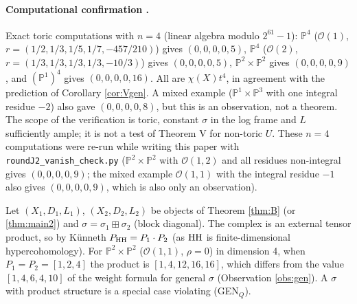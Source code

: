 \paragraph{Computational confirmation \tV.} Exact toric computations with $n=4$ (linear algebra modulo $2^{61}-1$): $\mathbb P^4$ ($\mathcal O(1)$, $r=(1/2,1/3,1/5,1/7,-457/210)$) gives $(0,0,0,0,5)$, $\mathbb P^4$ ($\mathcal O(2)$, $r=(1/3,1/3,1/3,1/3,-10/3)$) gives $(0,0,0,0,5)$, $\mathbb P^2\times\mathbb P^2$ gives $(0,0,0,0,9)$, and $(\mathbb P^1)^4$ gives $(0,0,0,0,16)$. All are $\chi(X)t^4$, in agreement with the prediction of Corollary \ref{cor:Vgen}. A mixed example ($\mathbb P^1\times\mathbb P^3$ with one integral residue $-2$) also gave $(0,0,0,0,8)$, but this is an observation, not a theorem. The scope of the verification is toric, constant $\sigma$ in the log frame and $L$ sufficiently ample; it is not a test of Theorem V for non-toric $U$. These $n=4$ computations were re-run while writing this paper with \texttt{roundJ2\_vanish\_check.py} ($\mathbb P^2\times\mathbb P^2$ with $\mathcal O(1,2)$ and all residues non-integral gives $(0,0,0,0,9)$; the mixed example $\mathcal O(1,1)$ with the integral residue $-1$ also gives $(0,0,0,0,9)$, which is also only an observation).

\begin{ex}[Products \tP \tV]\label{ex:prod}
Let $(X_1,D_1,L_1)$, $(X_2,D_2,L_2)$ be objects of Theorem \ref{thm:B} (or \ref{thm:main2}) and $\sigma=\sigma_1\boxplus\sigma_2$ (block diagonal). The complex is an external tensor product, so by K\"unneth $P_{\mathrm{HH}}=P_1\cdot P_2$ (as $\mathrm{HH}$ is finite-dimensional hypercohomology). For $\mathbb P^2\times\mathbb P^2$ ($\mathcal O(1,1)$, $\rho=0$) in dimension 4, when $P_1=P_2=[1,2,4]$ the product is $[1,4,12,16,16]$, which differs from the value $[1,4,6,4,10]$ of the weight formula for general $\sigma$ (Observation \ref{obs:gen}). A $\sigma$ with product structure is a special case violating (GEN$_Q$).
\end{ex}
